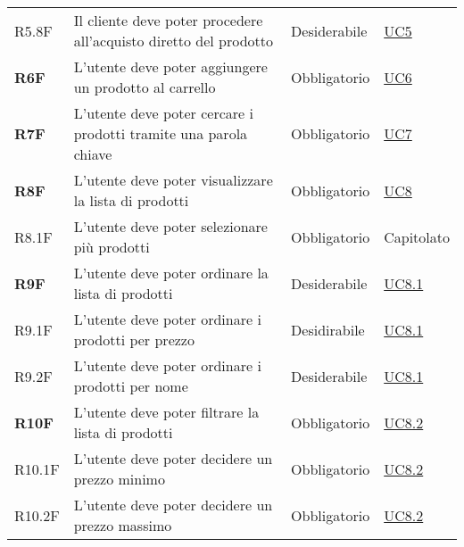 \begin{center}
\begin{longtable}[!h]{p{50px} p{245px} p{75px} p{50px}}
        R5.8F & Il cliente deve poter procedere all'acquisto diretto del prodotto & Desiderabile & \hyperref[sec:UC5]{UC5}\\
        \textbf{R6F}                          & L'utente deve poter aggiungere un prodotto al carrello                                              & Obbligatorio             & \hyperref[sec:UC6]{UC6}                      \\
        \textbf{R7F}                          & L'utente deve poter cercare i prodotti tramite una parola chiave                                    & Obbligatorio             & \hyperref[sec:UC7]{UC7}                      \\
        \textbf{R8F}                          & L'utente deve poter visualizzare la lista di prodotti                                               & Obbligatorio             & \hyperref[sec:UC8]{UC8}                      \\
        R8.1F                                 & L'utente deve poter selezionare più prodotti                                                        & Obbligatorio             & Capitolato                                   \\
        \textbf{R9F}                          & L'utente deve poter ordinare la lista di prodotti                                                   & Desiderabile             & \hyperref[sec:UC8.1]{UC8.1}                  \\
        R9.1F                                 & L'utente deve poter ordinare i prodotti per prezzo                                                & Desidirabile             & \hyperref[sec:UC8.1]{UC8.1}                  \\
        R9.2F                                 & L'utente deve poter ordinare i prodotti per nome                                                  & Desiderabile             & \hyperref[sec:UC8.1]{UC8.1}                  \\
        \textbf{R10F}                         & L'utente deve poter filtrare la lista di prodotti                                                   & Obbligatorio             & \hyperref[sec:UC8.2]{UC8.2}                  \\
        R10.1F                                & L'utente deve poter decidere un prezzo minimo                                                     & Obbligatorio             & \hyperref[sec:UC8.2]{UC8.2}                  \\
        R10.2F                                & L'utente deve poter decidere un prezzo massimo                                                    & Obbligatorio             & \hyperref[sec:UC8.2]{UC8.2}                  \\

\end{longtable}
\end{center}
